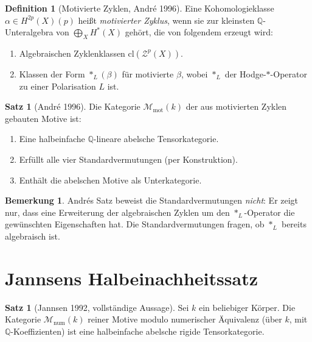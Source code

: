 \documentclass[12pt,a4paper]{amsart}
\theoremstyle{definition}
\newtheorem{satz}[theorem]{Satz}
\newtheorem{bemerkung}[theorem]{Bemerkung}
\newtheorem{definition_de}[theorem]{Definition}
\newcommand{\Q}{\mathbb{Q}}
\newcommand{\cl}{\mathrm{cl}}
\begin{document}
\begin{definition_de}[Motivierte Zyklen, Andr\'{e} 1996]
Eine Kohomologieklasse $\alpha \in H^{2p}(X)(p)$ heißt \emph{motivierter
Zyklus}, wenn sie zur kleinsten $\Q$-Unteralgebra von $\bigoplus_X H^*(X)$
gehört, die von folgendem erzeugt wird:
\begin{enumerate}[label=(\roman*)]
  \item Algebraischen Zyklenklassen $\cl(\mathcal{Z}^p(X))$.
  \item Klassen der Form $*_L(\beta)$ für motivierte $\beta$, wobei $*_L$
        der Hodge-$*$-Operator zu einer Polarisation $L$ ist.
\end{enumerate}
\end{definition_de}

\begin{satz}[Andr\'{e} 1996]\label{satz:andre}
Die Kategorie $\mathcal{M}_{\mathrm{mot}}(k)$ der aus motivierten Zyklen
gebauten Motive ist:
\begin{enumerate}[label=(\roman*)]
  \item Eine halbeinfache $\Q$-lineare abelsche Tensorkategorie.
  \item Erfüllt alle vier Standardvermutungen (per Konstruktion).
  \item Enthält die abelschen Motive als Unterkategorie.
\end{enumerate}
\end{satz}

\begin{bemerkung}
Andrés Satz beweist die Standardvermutungen \emph{nicht}: Er zeigt nur,
dass eine Erweiterung der algebraischen Zyklen um den $*_L$-Operator die
gewünschten Eigenschaften hat.  Die Standardvermutungen fragen, ob $*_L$
bereits algebraisch ist.
\end{bemerkung}

\section{Jannsens Halbeinachheitssatz}\label{sec:jannsen}

\begin{satz}[Jannsen 1992, vollständige Aussage]\label{satz:jannsen_voll}
Sei $k$ ein beliebiger Körper.  Die Kategorie $\mathcal{M}_{\mathrm{num}}(k)$
reiner Motive modulo numerischer Äquivalenz (über $k$, mit $\Q$-Koeffizienten)
ist eine halbeinfache abelsche rigide Tensorkategorie.
\end{satz}
\end{document}
